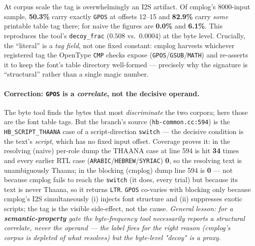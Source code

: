 \documentclass[11pt]{article}
\begin{document}
\noindent At corpus scale the tag is overwhelmingly an I2S artifact. Of
cmplog's 8000-input sample, \textbf{50.3\%} carry exactly \texttt{GPOS} at
offsets 12--15 and \textbf{82.9\%} carry \emph{some} printable table tag there;
for naive the figures are \textbf{0.0\%} and \textbf{6.1\%}. This reproduces the
tool's \texttt{decoy\_frac} ($0.508$ vs.\ $0.0004$) at the byte level. Crucially,
the ``literal'' is a \emph{tag field}, not one fixed constant: cmplog harvests
whichever registered tag the OpenType \texttt{CMP} checks expose
(\texttt{GPOS}/\texttt{GSUB}/\texttt{MATH}) and re-asserts it to keep the font's
table directory well-formed --- precisely why the signature is ``structural''
rather than a single magic number.

\paragraph{Correction: \texttt{GPOS} is a \emph{correlate}, not the decisive
operand.} The byte tool finds the bytes that most \emph{discriminate} the two
corpora; here those are the font table tags. But the branch's source
(\texttt{hb-common.cc:594}) is the \texttt{HB\_SCRIPT\_THAANA} case of a
script-direction \texttt{switch} --- the decisive condition is the text's
\emph{script}, which has no fixed input offset. Coverage proves it: in the
resolving (naive) per-role dump the THAANA case at line 594 is hit \textbf{34}
times and every earlier RTL case (\texttt{ARABIC}/\texttt{HEBREW}/\texttt{SYRIAC})
\textbf{0}, so the resolving text is unambiguously Thaana; in the blocking
(cmplog) dump line 594 is \textbf{0} --- not because cmplog fails to reach the
\texttt{switch} (it does, every trial) but because its text is never Thaana, so
it returns \texttt{LTR}. \texttt{GPOS} co-varies with blocking only because
cmplog's I2S simultaneously (i) injects font structure and (ii) suppresses exotic
scripts; the tag is the visible side-effect, not the cause. \emph{General lesson:
for a \textbf{semantic-property} gate the byte-frequency tool necessarily reports
a structural correlate, never the operand --- the label fires for the right
reason (cmplog's corpus is depleted of what resolves) but the byte-level "decoy"
is a proxy.}
\end{document}
